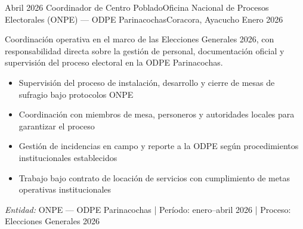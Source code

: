 \experience
{Abril 2026} {Coordinador de Centro Poblado}{Oficina Nacional de Procesos Electorales (ONPE) — ODPE Parinacochas}{Coracora, Ayacucho}
{Enero 2026} {
	Coordinación operativa en el marco de las Elecciones Generales 2026, con responsabilidad directa sobre la gestión de personal, documentación oficial y supervisión del proceso electoral en la ODPE Parinacochas.
	\begin{itemize}
		\item Supervisión del proceso de instalación, desarrollo y cierre de mesas de sufragio bajo protocolos ONPE
		\item Coordinación con miembros de mesa, personeros y autoridades locales para garantizar el proceso
		\item Gestión de incidencias en campo y reporte a la ODPE según procedimientos institucionales establecidos
		\item Trabajo bajo contrato de locación de servicios con cumplimiento de metas operativas institucionales
	\end{itemize}
}
{\footnotesize{\emph{Entidad:} ONPE — ODPE Parinacochas | Período: enero–abril 2026 | Proceso: Elecciones Generales 2026}}
